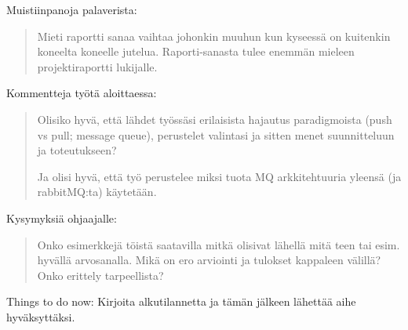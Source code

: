 Muistiinpanoja palaverista:
\begin{quote}
Mieti raportti sanaa vaihtaa johonkin muuhun kun kyseessä on kuitenkin koneelta koneelle jutelua. Raporti-sanasta tulee enemmän mieleen projektiraportti lukijalle.
\end{quote}

Kommentteja työtä aloittaessa:
\begin{quote}
	Olisiko hyvä, että lähdet työssäsi erilaisista hajautus paradigmoista (push vs pull; message queue), perustelet valintasi ja sitten menet suunnitteluun ja toteutukseen?
	
	Ja olisi hyvä, että työ perustelee miksi tuota MQ arkkitehtuuria yleensä (ja rabbitMQ:ta) käytetään.
\end{quote}

Kysymyksiä ohjaajalle:
\begin{quote}
	Onko esimerkkejä töistä saatavilla mitkä olisivat lähellä mitä teen tai esim. hyvällä arvosanalla.
	Mikä on ero arviointi ja tulokset kappaleen välillä? Onko erittely tarpeellista?
\end{quote}

Things to do now:
Kirjoita alkutilannetta ja tämän jälkeen lähettää aihe hyväksyttäksi.